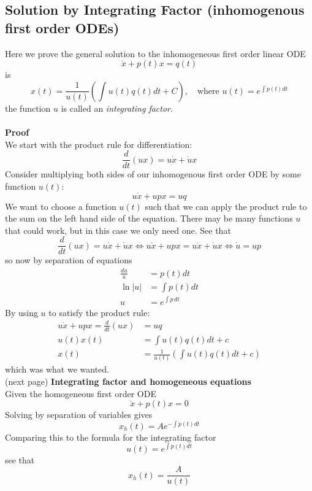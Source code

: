 \documentclass{report}
\begin{document}
\subsection{Solution by Integrating Factor (inhomogenous first order ODEs)}%
Here we prove the general solution to the inhomogeneous first order linear ODE 
\begin{equation*}
\dot{x}+p(t)x=q(t)
\end{equation*}
is\begin{equation*}
x(t)=\frac{1}{u(t)}\left(\int u(t)q(t)dt+C\right),
\quad\text{where }u(t)=e^{\int p(t)dt}
\end{equation*}
the function $u$ is called an \textit{integrating factor}.\\\vspace{1mm}\\
\textbf{Proof}\\
We start with the product rule for differentiation:
\begin{equation*}
\frac{d}{dt}(ux)=u\dot{x}+\dot{u}x
\end{equation*}
Consider multiplying both sides of our inhomogenous first order ODE by some function $u(t)$:
\begin{equation*}
u\dot{x}+upx=uq
\end{equation*}
We want to choose a function $u(t)$ such that we can apply the product rule to the sum on the left hand side
of the equation. There may be many functions $u$ that could work, but in this case we only need one. See that
\begin{equation*}
\frac{d}{dt}(ux)=u\dot{x}+\dot{u}x\iff u\dot{x}+upx=u\dot{x}+\dot{u}x\iff
\dot{u}=up
\end{equation*}
so now by separation of equations
\begin{align*}
\frac{du}{u}&=p(t)dt\\
\ln|u|&=\int p(t)dt\\
u&=e^{\int p\,dt}
\end{align*}
By using $u$ to satisfy the product rule:
\begin{align*}
u\dot{x}+upx=\frac{d}{dt}(ux)&=uq\\
u(t)x(t)&=\int u(t)q(t)dt+c\\
x(t)&=\frac{1}{u(t)}\left(\int u(t)q(t)dt+c\right)
\end{align*}
which was what we wanted.\\
(next page)
\newpage
\noindent\textbf{Integrating factor and homogeneous equations}\\
Given the homogeneous first order ODE
\begin{equation*}
\dot{x}+p(t)x=0
\end{equation*}
Solving by separation of variables gives
\begin{equation*}
x_h(t)=Ae^{-\int p(t)dt}
\end{equation*}
Comparing this to the formula for the integrating factor
\begin{equation*}
u(t)=e^{\int p(t)dt}
\end{equation*}
see that
\begin{equation*}
x_h(t)=\frac{A}{u(t)}
\end{equation*}
\newpage
\end{document}

